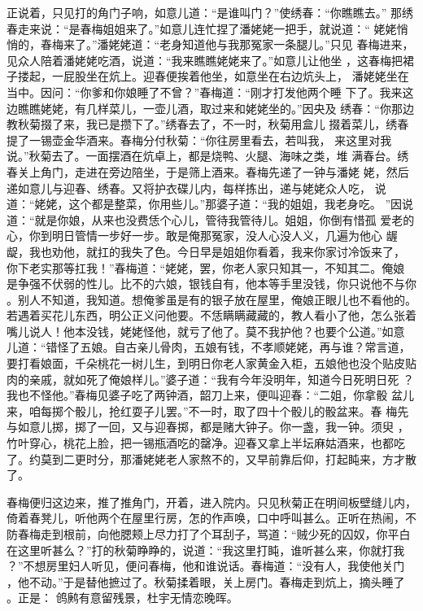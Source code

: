 正说着，只见打的角门子响，如意儿道：“是谁叫门？”使绣春：“你瞧瞧去。”
那绣春走来说：“是春梅姐姐来了。”如意儿连忙捏了潘姥姥一把手，就说道：“
姥姥悄悄的，春梅来了。”潘姥姥道：“老身知道他与我那冤家一条腿儿。”只见
春梅进来，见众人陪着潘姥姥吃酒，说道：“我来瞧瞧姥姥来了。”如意儿让他坐
，这春梅把裙子搂起，一屁股坐在炕上。迎春便挨着他坐，如意坐在右边炕头上，
潘姥姥坐在当中。因问：“你爹和你娘睡了不曾？”春梅道：“刚才打发他两个睡
下了。我来这边瞧瞧姥姥，有几样菜儿，一壶儿酒，取过来和姥姥坐的。”因央及
绣春：“你那边教秋菊掇了来，我已是攒下了。”绣春去了，不一时，秋菊用盒儿
掇着菜儿，绣春提了一锡壶金华酒来。春梅分付秋菊：“你往房里看去，若叫我，
来这里对我说。”秋菊去了。一面摆酒在炕卓上，都是烧鸭、火腿、海味之类，堆
满春台。绣春关上角门，走进在旁边陪坐，于是筛上酒来。春梅先递了一钟与潘姥
姥，然后递如意儿与迎春、绣春。又将护衣碟儿内，每样拣出，递与姥姥众人吃，
说道：“姥姥，这个都是整菜，你用些儿。”那婆子道：“我的姐姐，我老身吃。
”因说道：“就是你娘，从来也没费恁个心儿，管待我管待儿。姐姐，你倒有惜孤
爱老的心，你到明日管情一步好一步。敢是俺那冤家，没人心没人义，几遍为他心
龌龊，我也劝他，就扛的我失了色。今日早是姐姐你看着，我来你家讨冷饭来了，
你下老实那等扛我！”春梅道：“姥姥，罢，你老人家只知其一，不知其二。俺娘
是争强不伏弱的性儿。比不的六娘，银钱自有，他本等手里没钱，你只说他不与你
。别人不知道，我知道。想俺爹虽是有的银子放在屋里，俺娘正眼儿也不看他的。
若遇着买花儿东西，明公正义问他要。不恁瞒瞒藏藏的，教人看小了他，怎么张着
嘴儿说人！他本没钱，姥姥怪他，就亏了他了。莫不我护他？也要个公道。”如意
儿道：“错怪了五娘。自古亲儿骨肉，五娘有钱，不孝顺姥姥，再与谁？常言道，
要打看娘面，千朵桃花一树儿生，到明日你老人家黄金入柜，五娘他也没个贴皮贴
肉的亲戚，就如死了俺娘样儿。”婆子道：“我有今年没明年，知道今日死明日死
？我也不怪他。”春梅见婆子吃了两钟酒，韶刀上来，便叫迎春：“二姐，你拿骰
盆儿来，咱每掷个骰儿，抢红耍子儿罢。”不一时，取了四十个骰儿的骰盆来。春
梅先与如意儿掷，掷了一回，又与迎春掷，都是赌大钟子。你一盏，我一钟。须臾
，竹叶穿心，桃花上脸，把一锡瓶酒吃的罄净。迎春又拿上半坛麻姑酒来，也都吃
了。约莫到二更时分，那潘姥姥老人家熬不的，又早前靠后仰，打起盹来，方才散
了。

春梅便归这边来，推了推角门，开着，进入院内。只见秋菊正在明间板壁缝儿内，
倚着春凳儿，听他两个在屋里行房，怎的作声唤，口中呼叫甚么。正听在热闹，不
防春梅走到根前，向他腮颊上尽力打了个耳刮子，骂道：“贼少死的囚奴，你平白
在这里听甚么？”打的秋菊睁睁的，说道：“我这里打盹，谁听甚么来，你就打我
？”不想房里妇人听见，便问春梅，他和谁说话。春梅道：“没有人，我使他关门
，他不动。”于是替他摭过了。秋菊揉着眼，关上房门。春梅走到炕上，摘头睡了
。正是：
鸧鹒有意留残景，杜宇无情恋晚晖。

